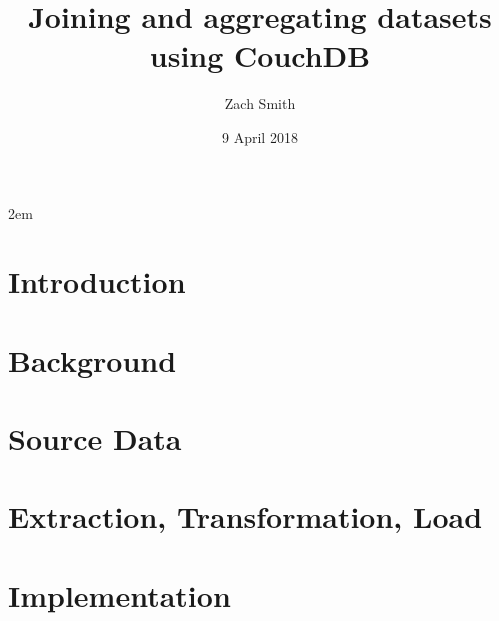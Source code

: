 \documentclass[
    a4paper,
    12pt
]{extreport}
\title{Joining and aggregating datasets using CouchDB}
\author{Zach Smith}
\date{9 April 2018}
\begin{document}
\emergencystretch 2em

\maketitle
\thispagestyle{empty}

\begin{abstract}
    
\end{abstract}
\newpage

\renewcommand{\abstractname}{Acknowledgements}
\begin{abstract}
    
\end{abstract}
\newpage

\let\origaddvspace\addvspace
\renewcommand{\addvspace}[1]{}
\tableofcontents
\newpage
\listoffigures
\newpage
\listoftables
\newpage
\renewcommand{\addvspace}[1]{\origaddvspace{#1}}

\chapter{Introduction}


\chapter{Background}





\chapter{Source Data}
\label{chapter:data}


\chapter{Extraction, Transformation, Load}





\chapter{Implementation}




\end{document}
